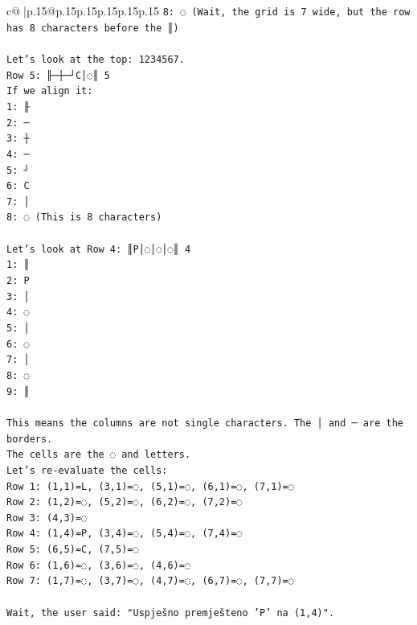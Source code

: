 \documentclass{article}
\begin{document}
{\begin{supertabular}{c@{$\;$}|p{.15\linewidth}@{}p{.15\linewidth}p{.15\linewidth}p{.15\linewidth}p{.15\linewidth}p{.15\linewidth}}
{{{\texttt{8: ◌ (Wait, the grid is 7 wide, but the row has 8 characters before the ║)} \\
\\ 
\texttt{Let's look at the top:  1234567.} \\
\texttt{Row 5: ╟─┼─┘C│◌║ 5} \\
\texttt{If we align it:} \\
\texttt{1: ╟} \\
\texttt{2: ─} \\
\texttt{3: ┼} \\
\texttt{4: ─} \\
\texttt{5: ┘} \\
\texttt{6: C} \\
\texttt{7: │} \\
\texttt{8: ◌ (This is 8 characters)} \\
\\ 
\texttt{Let's look at Row 4: ║P│◌│◌│◌║ 4} \\
\texttt{1: ║} \\
\texttt{2: P} \\
\texttt{3: │} \\
\texttt{4: ◌} \\
\texttt{5: │} \\
\texttt{6: ◌} \\
\texttt{7: │} \\
\texttt{8: ◌} \\
\texttt{9: ║} \\
\\ 
\texttt{This means the columns are not single characters. The │ and ─ are the borders.} \\
\texttt{The cells are the ◌ and letters.} \\
\texttt{Let's re{-}evaluate the cells:} \\
\texttt{Row 1: (1,1)=L, (3,1)=◌, (5,1)=◌, (6,1)=◌, (7,1)=◌} \\
\texttt{Row 2: (1,2)=◌, (5,2)=◌, (6,2)=◌, (7,2)=◌} \\
\texttt{Row 3: (4,3)=◌} \\
\texttt{Row 4: (1,4)=P, (3,4)=◌, (5,4)=◌, (7,4)=◌} \\
\texttt{Row 5: (6,5)=C, (7,5)=◌} \\
\texttt{Row 6: (1,6)=◌, (3,6)=◌, (4,6)=◌} \\
\texttt{Row 7: (1,7)=◌, (3,7)=◌, (4,7)=◌, (6,7)=◌, (7,7)=◌} \\
\\ 
\texttt{Wait, the user said: "Uspješno premješteno 'P' na (1,4)".} \\
}}}
\end{supertabular}}
\end{document}
